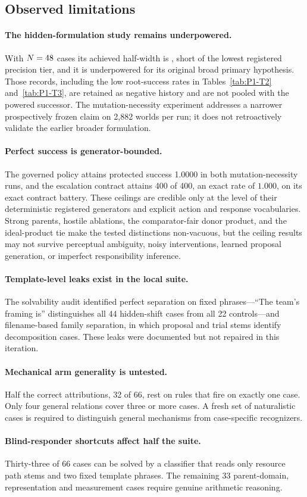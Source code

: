 \subsection{Observed limitations}

\paragraph{The hidden-formulation study remains underpowered.}
With $N=48{}$ cases its achieved half-width is
\AchievedHalfWidth{}, short of the lowest registered precision tier, and it is
underpowered for its original broad primary hypothesis. Those
records, including the low root-success rates in Tables~\ref{tab:P1-T2}
and~\ref{tab:P1-T3}, are retained as negative history and are not pooled with
the powered successor. The mutation-necessity experiment addresses a narrower
prospectively frozen claim on 2,882 worlds per run; it does not retroactively
validate the earlier broader formulation.

\paragraph{Perfect success is generator-bounded.}
The governed policy attains protected success 1.0000 in both mutation-necessity
runs, and the escalation contract attains 400 of 400, an exact rate of $1.000$, on
its exact contract battery. These ceilings are credible only at the level of their deterministic
registered generators and explicit action and response vocabularies. Strong
parents, hostile ablations, the comparator-fair donor product, and the
ideal-product tie make the tested distinctions non-vacuous, but the ceiling
results may not survive perceptual ambiguity, noisy interventions, learned
proposal generation, or imperfect responsibility inference.

\paragraph{Template-level leaks exist in the local suite.}
The solvability audit identified perfect separation on fixed phrases---``The
team's framing is'' distinguishes all 44 hidden-shift cases from all 22
controls---and filename-based family separation, in which proposal and trial
stems identify decomposition cases. These leaks were documented but not repaired
in this iteration.

\paragraph{Mechanical arm generality is untested.}
Half the correct attributions, 32 of 66, rest on rules that fire on exactly one
case. Only four general relations cover three or more cases. A fresh set of
naturalistic cases is required to distinguish general mechanisms from
case-specific recognizers.

\paragraph{Blind-responder shortcuts affect half the suite.}
Thirty-three of 66 cases can be solved by a classifier that reads only resource
path stems and two fixed template phrases. The remaining 33 parent-domain,
representation and measurement cases require genuine arithmetic reasoning.
